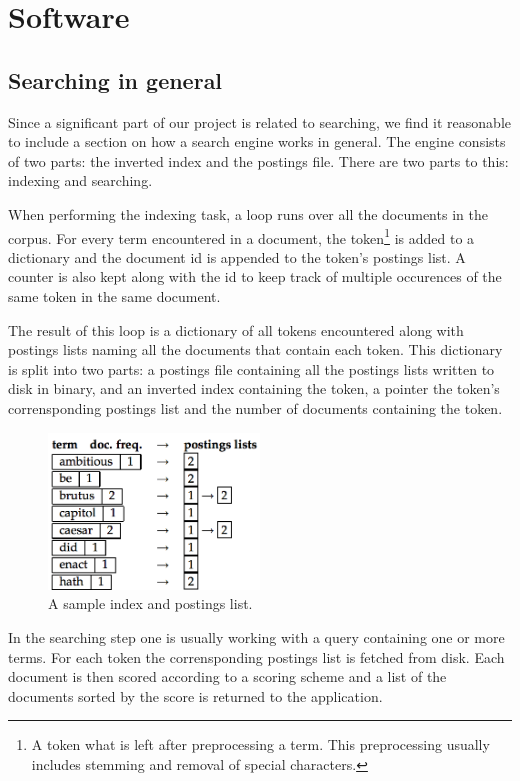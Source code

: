 
\section{Software}
\subsection{Searching in general}
Since a significant part of our project is related to searching, we find it reasonable to include a section on how a search engine works in general. The engine consists of two parts: the inverted index and the postings file. There are two parts to this: indexing and searching.

When performing the indexing task, a loop runs over all the documents in the corpus. For every term encountered in a document, the token\footnote{A token what is left after preprocessing a term. This preprocessing usually includes stemming and removal of special characters.} is added to a dictionary and the document id is appended to the token's postings list. A counter is also kept along with the id to keep track of multiple occurences of the same token in the same document.

The result of this loop is a dictionary of all tokens encountered along with postings lists naming all the documents that contain each token. This dictionary is split into two parts: a postings file containing all the  postings lists written to disk in binary, and an inverted index containing the token, a pointer the token's corrensponding postings list and the number of documents containing the token.

\begin{figure}
    \includegraphics[width=0.5\textwidth]{software/index_postings_lists}
    \caption{A sample index and postings list.}
    \label{fig:index_postings_lists_sw}
\end{figure}

In the searching step one is usually working with a query containing one or more terms. For each token the corrensponding postings list is fetched from disk. Each document is then scored according to a scoring scheme and a list of the documents sorted by the score is returned to the application.\cite{IntroIR}



